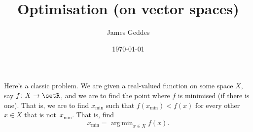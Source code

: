 \documentclass[11pt, a4paper]{article}
\author{James Geddes}
\date{\today}
\title{Optimisation (on vector spaces)}
\DeclareMathOperator*{\argmin}{arg\,min}
\begin{document}
\maketitle

Here's a classic problem. We are given a real-valued function on some
space $X$, say $f\colon X\to \setR$, and we are to find the point where
$f$ is minimised (if there is one). That is, we are to find
$x_\text{min}$ such that $f(x_\text{min}) < f(x)$ for every other $x\in
X$ that is not~$x_\text{min}$. That is, find
\begin{equation*}
  x_\text{min} = \argmin_{x\in X} f(x).
\end{equation*}
\end{document}
